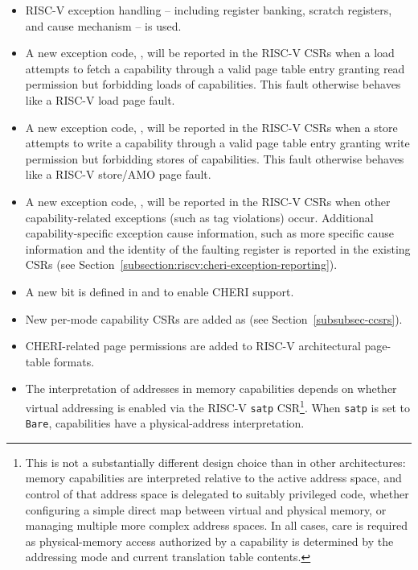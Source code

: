\begin{itemize}
\item RISC-V exception handling -- including register banking, scratch
  registers, and cause mechanism -- is used.
\item A new exception code, \riscvloadcappagefault{}, will be
  reported in the RISC-V \xcause{} CSRs when a load attempts to fetch a
  capability through a valid page table entry granting read permission but
  forbidding loads of capabilities.  This fault otherwise behaves like a RISC-V
  load page fault.
\item A new exception code, \riscvstorecappagefault{}, will be
  reported in the RISC-V \xcause{} CSRs when a store attempts to write a
  capability through a valid page table entry granting write permission but
  forbidding stores of capabilities.  This fault otherwise behaves like a
  RISC-V store/AMO page fault.
\item A new exception code, \riscvcheriexception{}, will be
  reported in the RISC-V \xcause{} CSRs when other
  capability-related exceptions (such as tag violations) occur.
  Additional capability-specific exception cause information, such
  as more specific cause information and the identity of the faulting
  register is reported in the existing \xtval{} CSRs (see
  Section~\ref{subsection:riscv:cheri-exception-reporting}).
\item A new bit is defined in \menvcfg{} and \senvcfg{} to enable
  CHERI support.
\item New per-mode capability CSRs are added as \xccsr{} (see
  Section~\ref{subsubsec-ccsrs}).
\item CHERI-related page permissions are added to RISC-V architectural
  page-table formats.
\item The interpretation of addresses in memory capabilities
  depends on whether virtual addressing is enabled via the RISC-V
  \texttt{satp} CSR\footnote{This is not a substantially different design
  choice than in other architectures: memory
  capabilities are interpreted relative to the active address space, and
  control of that address space is delegated to suitably privileged code,
  whether configuring a simple direct map between virtual and physical memory,
  or managing multiple more complex address spaces.
  In all cases, care is required as physical-memory access authorized by a
  capability is determined by the addressing mode and current translation
  table contents.}.
  When \texttt{satp} is set to \texttt{Bare}, capabilities have a
  physical-address interpretation.

\end{itemize}
